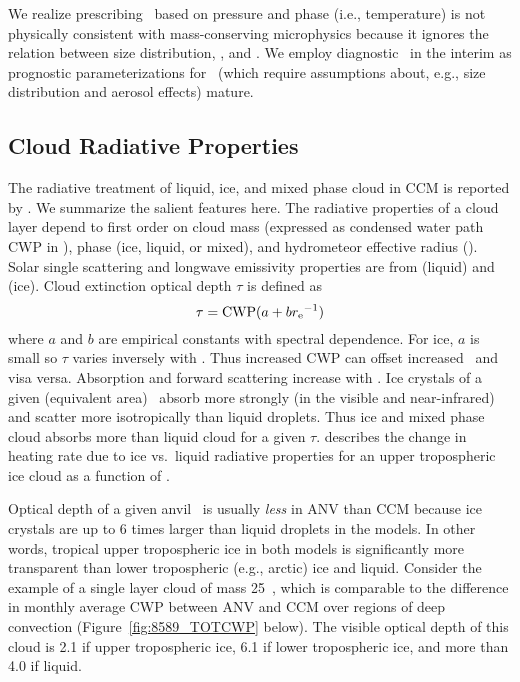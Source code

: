 \documentclass[agums]{aguplus}
\begin{document}
We realize prescribing \rdsffc\ based on pressure and phase (i.e.,
temperature) is not physically consistent with mass-conserving
microphysics because it ignores the relation between size
distribution, \rdsffc, and \qc.
We employ diagnostic \rdsffc\ in the interim as prognostic
parameterizations for \rdsffc\ (which require assumptions about, e.g.,
size distribution and aerosol effects) mature. 

\subsection{Cloud Radiative Properties}\label{sec:ebc}

The radiative treatment of liquid, ice, and mixed phase cloud in CCM
is reported by \cite{Kie961}.
We summarize the salient features here.
The radiative properties of a cloud layer depend to first order on
cloud mass (expressed as condensed water path CWP in \gxmS), phase
(ice, liquid, or mixed), and hydrometeor effective radius (\rdsffc). 
Solar single scattering and longwave emissivity properties are from
\cite{Sli89} (liquid) and \cite{EbC92} (ice).
Cloud extinction optical depth $\tau$ is defined as
\begin{equation}
\label{eqn:tau}
\tau = \CWP (a + b\rdsffc^{-1})
\end{equation}
where $a$ and $b$ are empirical constants with spectral dependence.
For ice, $a$ is small so $\tau$ varies inversely with \rdsffc.
Thus increased CWP can offset increased \rdsffc\ and visa versa. 
Absorption and forward scattering increase with \rdsffc.
Ice crystals of a given (equivalent area) \rdsffc\ absorb more strongly
(in the visible and near-infrared) and scatter more isotropically than
liquid droplets.
Thus ice and mixed phase cloud absorbs more than liquid cloud for a
given $\tau$.
\cite{Kie961} describes the change in heating rate due to ice vs.\
liquid radiative properties for an upper tropospheric ice cloud as a
function of \rdsffc.

Optical depth of a given anvil \qc\ is usually \textit{less} in ANV
than CCM because ice crystals are up to 6 times larger than liquid
droplets in the models. 
In other words, tropical upper tropospheric ice in both models is
significantly more transparent than lower tropospheric (e.g., arctic)
ice and liquid.  
Consider the example of a single layer cloud of mass 25~\gxmS, which
is comparable to the difference in monthly average CWP between ANV and
CCM over regions of deep convection (Figure~\ref{fig:8589_TOTCWP}
below).  
The visible optical depth of this cloud is 2.1 if upper tropospheric 
ice, 6.1 if lower tropospheric ice, and more than 4.0 if liquid.
\end{document}
